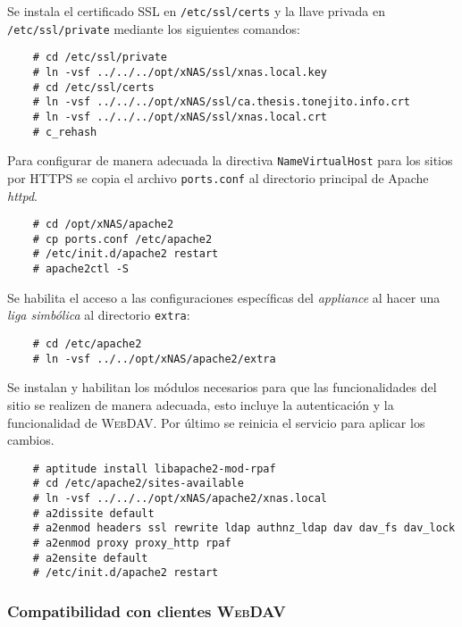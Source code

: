 Se instala el certificado \textsc{SSL} en \texttt{/etc/ssl/certs} y la llave privada en \texttt{/etc/ssl/private} mediante los siguientes comandos:

{
\scriptsize
\linespread{1}
\begin{verbatim}
    # cd /etc/ssl/private
    # ln -vsf ../../../opt/xNAS/ssl/xnas.local.key
    # cd /etc/ssl/certs
    # ln -vsf ../../../opt/xNAS/ssl/ca.thesis.tonejito.info.crt
    # ln -vsf ../../../opt/xNAS/ssl/xnas.local.crt
    # c_rehash
\end{verbatim}
}

Para configurar de manera adecuada la directiva \texttt{NameVirtualHost} para los sitios por \textsc{HTTPS} se copia el archivo \texttt{ports.conf} al directorio principal de Apache \textit{httpd}.

{
\scriptsize
\linespread{1}
\begin{verbatim}
    # cd /opt/xNAS/apache2
    # cp ports.conf /etc/apache2
    # /etc/init.d/apache2 restart
    # apache2ctl -S
\end{verbatim}
}

Se habilita el acceso a las configuraciones espec\'{i}ficas del \textit{appliance} al hacer una \textit{liga simb\'{o}lica} al directorio \texttt{extra}:

{
\scriptsize
\linespread{1}
\begin{verbatim}
    # cd /etc/apache2
    # ln -vsf ../../opt/xNAS/apache2/extra
\end{verbatim}
}

Se instalan y habilitan los m\'{odulos} necesarios para que las funcionalidades del sitio se realizen de manera adecuada, esto incluye la autenticaci\'{o}n y la funcionalidad de \textsc{WebDAV}. Por \'{u}ltimo se reinicia el servicio para aplicar los cambios.

{
\scriptsize
\linespread{1}
\begin{verbatim}
    # aptitude install libapache2-mod-rpaf
    # cd /etc/apache2/sites-available
    # ln -vsf ../../../opt/xNAS/apache2/xnas.local
    # a2dissite default
    # a2enmod headers ssl rewrite ldap authnz_ldap dav dav_fs dav_lock
    # a2enmod proxy proxy_http rpaf
    # a2ensite default
    # /etc/init.d/apache2 restart
\end{verbatim}
}

        \subsubsection {Compatibilidad con clientes \textsc{WebDAV}}

